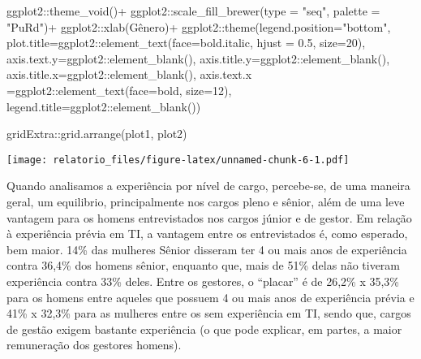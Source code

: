 \documentclass[
]{article}
\newenvironment{Shaded}{\begin{snugshade}}{\end{snugshade}}
\newcommand{\AttributeTok}[1]{\textcolor[rgb]{0.77,0.63,0.00}{#1}}
\newcommand{\DecValTok}[1]{\textcolor[rgb]{0.00,0.00,0.81}{#1}}
\newcommand{\FloatTok}[1]{\textcolor[rgb]{0.00,0.00,0.81}{#1}}
\newcommand{\FunctionTok}[1]{\textcolor[rgb]{0.00,0.00,0.00}{#1}}
\newcommand{\NormalTok}[1]{#1}
\newcommand{\SpecialCharTok}[1]{\textcolor[rgb]{0.00,0.00,0.00}{#1}}
\newcommand{\StringTok}[1]{\textcolor[rgb]{0.31,0.60,0.02}{#1}}
\begin{document}
\begin{Shaded}
\begin{Highlighting}[]
\NormalTok{  ggplot2}\SpecialCharTok{::}\FunctionTok{theme\_void}\NormalTok{()}\SpecialCharTok{+}
\NormalTok{  ggplot2}\SpecialCharTok{::}\FunctionTok{scale\_fill\_brewer}\NormalTok{(}\AttributeTok{type =} \StringTok{"seq"}\NormalTok{, }\AttributeTok{palette =} \StringTok{"PuRd"}\NormalTok{)}\SpecialCharTok{+}
\NormalTok{  ggplot2}\SpecialCharTok{::}\FunctionTok{xlab}\NormalTok{(}\StringTok{\textquotesingle{}Gênero\textquotesingle{}}\NormalTok{)}\SpecialCharTok{+}
\NormalTok{  ggplot2}\SpecialCharTok{::}\FunctionTok{theme}\NormalTok{(}\AttributeTok{legend.position=}\StringTok{"bottom"}\NormalTok{,}
                 \AttributeTok{plot.title=}\NormalTok{ggplot2}\SpecialCharTok{::}\FunctionTok{element\_text}\NormalTok{(}\AttributeTok{face=}\StringTok{\textquotesingle{}bold.italic\textquotesingle{}}\NormalTok{,}
                                                  \AttributeTok{hjust =} \FloatTok{0.5}\NormalTok{, }\AttributeTok{size=}\DecValTok{20}\NormalTok{),}
                 \AttributeTok{axis.text.y=}\NormalTok{ggplot2}\SpecialCharTok{::}\FunctionTok{element\_blank}\NormalTok{(),}
                 \AttributeTok{axis.title.y=}\NormalTok{ggplot2}\SpecialCharTok{::}\FunctionTok{element\_blank}\NormalTok{(),}
                 \AttributeTok{axis.title.x=}\NormalTok{ggplot2}\SpecialCharTok{::}\FunctionTok{element\_blank}\NormalTok{(),}
                 \AttributeTok{axis.text.x =}\NormalTok{ggplot2}\SpecialCharTok{::}\FunctionTok{element\_text}\NormalTok{(}\AttributeTok{face=}\StringTok{\textquotesingle{}bold\textquotesingle{}}\NormalTok{, }\AttributeTok{size=}\DecValTok{12}\NormalTok{),}
                 \AttributeTok{legend.title=}\NormalTok{ggplot2}\SpecialCharTok{::}\FunctionTok{element\_blank}\NormalTok{())}

\NormalTok{gridExtra}\SpecialCharTok{::}\FunctionTok{grid.arrange}\NormalTok{(plot1, plot2)}
\end{Highlighting}
\end{Shaded}

\texttt{[image: relatorio\_files/figure-latex/unnamed-chunk-6-1.pdf]}

Quando analisamos a experiência por nível de cargo, percebe-se, de uma
maneira geral, um equilibrio, principalmente nos cargos pleno e sênior,
além de uma leve vantagem para os homens entrevistados nos cargos júnior
e de gestor. Em relação à experiência prévia em TI, a vantagem entre os
entrevistados é, como esperado, bem maior. 14\% das mulheres Sênior
disseram ter 4 ou mais anos de experiência contra 36,4\% dos homens
sênior, enquanto que, mais de 51\% delas não tiveram experiência contra
33\% deles. Entre os gestores, o ``placar'' é de 26,2\% x 35,3\% para os
homens entre aqueles que possuem 4 ou mais anos de experiência prévia e
41\% x 32,3\% para as mulheres entre os sem experiência em TI, sendo
que, cargos de gestão exigem bastante experiência (o que pode explicar,
em partes, a maior remuneração dos gestores homens).
\end{document}
